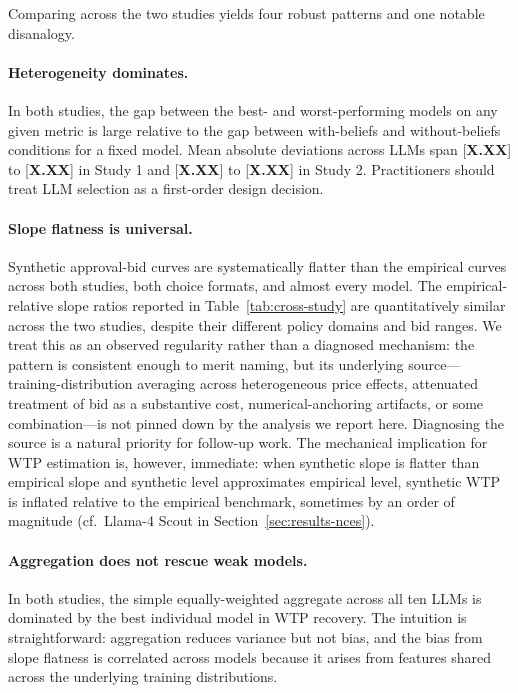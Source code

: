 \documentclass[12pt]{article}
\begin{document}
Comparing across the two studies yields four robust patterns and one
notable disanalogy.

\paragraph{Heterogeneity dominates.} In both studies, the gap between the
best- and worst-performing models on any given metric is large relative
to the gap between with-beliefs and without-beliefs conditions for a
fixed model. Mean absolute deviations across LLMs span [\textbf{X.XX}]
to [\textbf{X.XX}] in Study 1 and [\textbf{X.XX}] to [\textbf{X.XX}] in
Study 2. Practitioners should treat LLM selection as a first-order design
decision.

\paragraph{Slope flatness is universal.} Synthetic approval-bid curves
are systematically flatter than the empirical curves across both studies,
both choice formats, and almost every model. The empirical-relative slope
ratios reported in Table~\ref{tab:cross-study} are quantitatively similar
across the two studies, despite their different policy domains and bid
ranges. We treat this as an observed regularity rather than a diagnosed
mechanism: the pattern is consistent enough to merit naming, but its
underlying source---training-distribution averaging across heterogeneous
price effects, attenuated treatment of bid as a substantive cost,
numerical-anchoring artifacts, or some combination---is not pinned down
by the analysis we report here. Diagnosing the source is a natural
priority for follow-up work. The mechanical implication for WTP estimation
is, however, immediate: when synthetic slope is flatter than empirical
slope and synthetic level approximates empirical level, synthetic WTP is
inflated relative to the empirical benchmark, sometimes by an order of
magnitude (cf.~Llama-4 Scout in Section~\ref{sec:results-nces}).

\paragraph{Aggregation does not rescue weak models.} In both studies, the
simple equally-weighted aggregate across all ten LLMs is dominated by the
best individual model in WTP recovery. The intuition is straightforward:
aggregation reduces variance but not bias, and the bias from slope
flatness is correlated across models because it arises from features
shared across the underlying training distributions.
\end{document}
